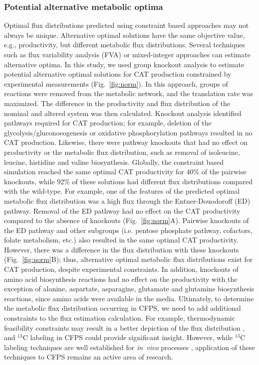 \documentclass[journal=asbcd6,manuscript=article]{achemso}
\begin{document}
\subsubsection{Potential alternative metabolic optima}
Optimal flux distributions predicted using constraint based approaches may not always be unique.
Alternative optimal solutions have the same objective value, e.g., productivity, but different metabolic flux distributions.
Several techniques such as flux variability analysis (FVA) \cite{Mahadevan2003264,Schuetz:2007aa} or mixed-integer approaches \cite{LEE2000711} can estimate alternative optima.
In this study, we used group knockout analysis to estimate potential alternative optimal solutions for CAT production constrained by experimental measurements (Fig.~\ref{fig:norm}).
In this approach, groups of reactions were removed from the metabolic network, and the translation rate was maximized.
The difference in the productivity and flux distribution of the nominal and altered system was then calculated.
Knockout analysis identified pathways required for CAT production; for example, deletion of the glycolysis/gluconoeogenesis or oxidative phosphorylation pathways resulted in no CAT production.
Likewise, there were pathway knockouts that had no effect on productivity or the metabolic flux distribution, such as removal of isoleucine, leucine, histidine and valine biosynthesis.
Globally, the constraint based simulation reached the same optimal CAT productivity for 40\% of the pairwise knockouts, while 92\% of these solutions had different flux distributions compared with the wild-type.
For example, one of the features of the predicted optimal metabolic flux distribution was a high flux through the Entner-Douodoroff (ED) pathway.
Removal of the ED pathway had no effect on the CAT productivity compared to the absence of knockouts (Fig.~\ref{fig:norm}A).
Pairwise knockouts of the ED pathway and other subgroups (i.e. pentose phosphate pathway, cofactors, folate metabolism, etc.) also resulted in the same optimal CAT productivity.
However, there was a difference in the flux distribution with these knockouts (Fig.~\ref{fig:norm}B); thus, alternative optimal metabolic flux distributions exist for CAT production, despite experimental constraints.
In addition, knockouts of amino acid biosynthesis reactions had no effect on the productivity with the exception of alanine, aspartate, asparagine, glutamate and glutamine biosynthesis reactions, since amino acids were available in the media.
Ultimately, to determine the metabolic flux distribution occurring in CFPS, we need to add additional constraints to the flux estimation calculation.
For example, thermodynamic feasibility constraints may result in a better depiction of the flux distribution \cite{Henry:2007,Hamilton:2013}, and $^{13}$C labeling in CFPS could provide significant insight.
However, while $^{13}$C labeling techniques are well established for \emph{in~vivo} processes \cite{Zamboni:2009}, application of these techniques to CFPS remains an active area of research.
\end{document}
